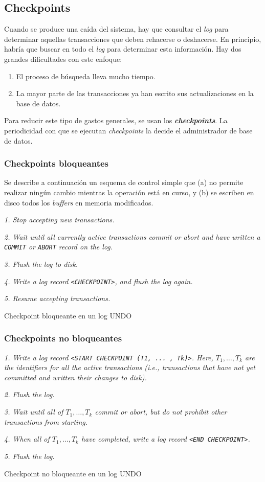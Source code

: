 \documentclass[a4paper, twoside]{article}
\begin{document}
\subsection{Checkpoints}
Cuando se produce una caída del sistema, hay que consultar el \emph{log} para determinar aquellas transacciones que deben rehacerse o deshacerse. En principio, habría que buscar en todo el \emph{log} para determinar esta información. Hay dos grandes dificultades con este enfoque: 
\begin{enumerate}
	\item El proceso de búsqueda lleva mucho tiempo. 
	\item La mayor parte de las transacciones ya han escrito sus actualizaciones en la base de datos. 
\end{enumerate}

Para reducir este tipo de gastos generales, se usan los \textbf{\emph{checkpoints}}. La periodicidad con que se ejecutan \emph{checkpoints} la decide el administrador de base de datos.

\subsubsection{Checkpoints bloqueantes}
Se describe a continuación un esquema de control simple que (a) no permite realizar ningún cambio mientras la operación está en curso, y (b) se escriben en disco todos los \emph{buffers} en memoria modificados. 

\begin{algorithm}[H]
	\emph{1. Stop accepting new transactions.}

	\emph{2. Wait until all currently active transactions commit or abort and have written a \texttt{COMMIT} or \texttt{ABORT} record on the log.}

	\emph{3. Flush the log to disk.}

	\emph{4. Write a log record \texttt{<CHECKPOINT>}, and flush the log again.}

	\emph{5. Resume accepting transactions.}
	\caption{Checkpoint bloqueante en un log UNDO}
\end{algorithm}

\subsubsection{Checkpoints no bloqueantes}
\begin{algorithm}[H]
	\emph{1. Write a log record \texttt{<START CHECKPOINT (T1, ... , Tk)>}. Here, $T_{1},\ldots,T_{k}$ are the identifiers for all the active transactions (i.e., transactions that have not yet committed and written their changes to disk).}

	\emph{2. Flush the log.}

	\emph{3. Wait until all of $T_{1},\ldots,T_{k}$ commit or abort, but do not prohibit other transactions from starting.}

	\emph{4. When all of $T_{1}, \ldots, T_{k}$ have completed, write a log record \texttt{<END CHECKPOINT>}.}

	\emph{5. Flush the log.}
	\caption{Checkpoint no bloqueante en un log UNDO}
\end{algorithm}
\end{document}
